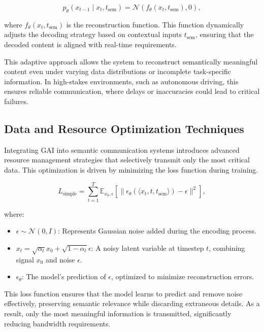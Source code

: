 \documentclass[journal]{IEEEtran}
\begin{document}
\begin{equation}
p_\theta(x_{t-1} \mid x_t, t_{\text{sem}}) = \mathcal{N}(f_\theta(x_t, t_{\text{sem}}), 0),
\end{equation}

where \( f_\theta(x_t, t_{\text{sem}}) \) is the reconstruction function. This function dynamically adjusts the decoding strategy based on contextual inputs \( t_{\text{sem}} \), ensuring that the decoded content is aligned with real-time requirements.

This adaptive approach allows the system to reconstruct semantically meaningful content even under varying data distributions or incomplete task-specific information. In high-stakes environments, such as autonomous driving, this ensures reliable communication, where delays or inaccuracies could lead to critical failures.

\subsection{Data and Resource Optimization Techniques}
Integrating GAI into semantic communication systems introduces advanced resource management strategies that selectively transmit only the most critical data. This optimization is driven by minimizing the loss function during training.

\begin{equation}
L_{\text{simple}} = \sum_{t=1}^T \mathbb{E}_{x_0, \epsilon} \left[ \| \epsilon_\theta(\langle x_t, t, t_{\text{sem}} \rangle) - \epsilon \|^2 \right],
\end{equation}

where:
\begin{itemize}
    \item \( \epsilon \sim \mathcal{N}(0, I) \): Represents Gaussian noise added during the encoding process.
    \item \( x_t = \sqrt{\alpha_t} x_0 + \sqrt{1 - \alpha_t} \epsilon \): A noisy latent variable at timestep \( t \), combining signal \( x_0 \) and noise \( \epsilon \).
    \item \( \epsilon_\theta \): The model’s prediction of \( \epsilon \), optimized to minimize reconstruction errors.
\end{itemize}

This loss function ensures that the model learns to predict and remove noise effectively, preserving semantic relevance while discarding extraneous details. As a result, only the most meaningful information is transmitted, significantly reducing bandwidth requirements.
\end{document}
